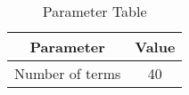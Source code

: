 
\begin{table}[ht]
  \centering
  \begin{tabular}{|c|c|}
    \hline
    Parameter & Value \\
    \hline
     Number of terms & 40\\
    \hline
  \end{tabular}
  \vspace{2mm}
  \caption{Parameter Table}
\end{table}
